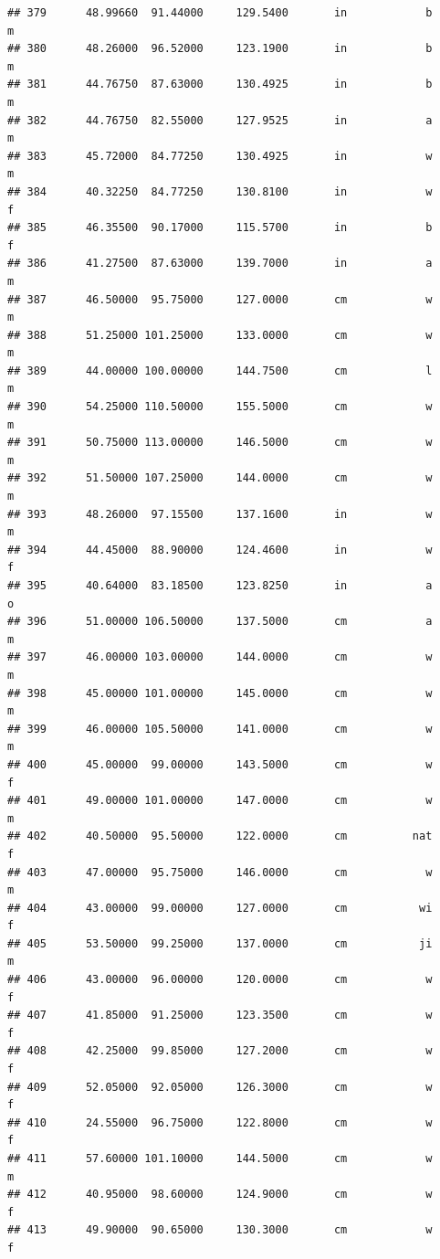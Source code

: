 \documentclass[]{article}
\begin{document}
\begin{verbatim}
## 379      48.99660  91.44000     129.5400       in            b         m
## 380      48.26000  96.52000     123.1900       in            b         m
## 381      44.76750  87.63000     130.4925       in            b         m
## 382      44.76750  82.55000     127.9525       in            a         m
## 383      45.72000  84.77250     130.4925       in            w         m
## 384      40.32250  84.77250     130.8100       in            w         f
## 385      46.35500  90.17000     115.5700       in            b         f
## 386      41.27500  87.63000     139.7000       in            a         m
## 387      46.50000  95.75000     127.0000       cm            w         m
## 388      51.25000 101.25000     133.0000       cm            w         m
## 389      44.00000 100.00000     144.7500       cm            l         m
## 390      54.25000 110.50000     155.5000       cm            w         m
## 391      50.75000 113.00000     146.5000       cm            w         m
## 392      51.50000 107.25000     144.0000       cm            w         m
## 393      48.26000  97.15500     137.1600       in            w         m
## 394      44.45000  88.90000     124.4600       in            w         f
## 395      40.64000  83.18500     123.8250       in            a         o
## 396      51.00000 106.50000     137.5000       cm            a         m
## 397      46.00000 103.00000     144.0000       cm            w         m
## 398      45.00000 101.00000     145.0000       cm            w         m
## 399      46.00000 105.50000     141.0000       cm            w         m
## 400      45.00000  99.00000     143.5000       cm            w         f
## 401      49.00000 101.00000     147.0000       cm            w         m
## 402      40.50000  95.50000     122.0000       cm          nat         f
## 403      47.00000  95.75000     146.0000       cm            w         m
## 404      43.00000  99.00000     127.0000       cm           wi         f
## 405      53.50000  99.25000     137.0000       cm           ji         m
## 406      43.00000  96.00000     120.0000       cm            w         f
## 407      41.85000  91.25000     123.3500       cm            w         f
## 408      42.25000  99.85000     127.2000       cm            w         f
## 409      52.05000  92.05000     126.3000       cm            w         f
## 410      24.55000  96.75000     122.8000       cm            w         f
## 411      57.60000 101.10000     144.5000       cm            w         m
## 412      40.95000  98.60000     124.9000       cm            w         f
## 413      49.90000  90.65000     130.3000       cm            w         f

\end{verbatim}
\end{document}
